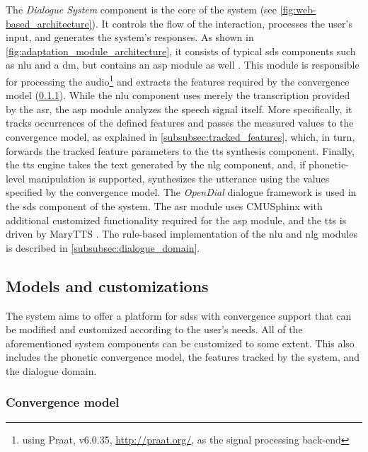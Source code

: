 The \emph{Dialogue System} component is the core of the system (see \cref{fig:web-based_architecture}).
It controls the flow of the interaction, processes the user's input, and generates the system's responses.
As shown in \cref{fig:adaptation_module_architecture}, it consists of typical \ac{sds} components such as \ac{nlu} and a \ac{dm}, but contains an \ac{asp} module as well \citep{Raveh2017SemDial}.
This module is responsible for processing the audio\footnote{\label{foot:praatver}using Praat, v6.0.35, \url{http://praat.org/}, \citep{Boersma2018praat} as the signal processing back-end} and extracts the features required by the convergence model (\cref{subsubsec:convergence_model}).
While the \ac{nlu} component uses merely the transcription provided by the \ac{asr}, the \ac{asp} module analyzes the speech signal itself.
More specifically, it tracks occurrences of the defined features and passes the measured values to the convergence model, as explained in \cref{subsubsec:tracked_features}, which, in turn, forwards the tracked feature parameters to the \ac{tts} synthesis component.
Finally, the \ac{tts} engine takes the text generated by the \ac{nlg} component, and, if phonetic-level manipulation is supported, synthesizes the utterance using the values specified by the convergence model.
The \emph{OpenDial} dialogue framework \citep{Lison2016opendial} is used in the \ac{sds} component of the system.
The \ac{asr} module uses CMUSphinx \citep{Lamere2003sphinx} with additional customized functionality required for the \ac{asp} module, and the \ac{tts} is driven by MaryTTS \citep{LeMaguer2017uprooted, Schroeder2003mary}.
The rule-based implementation of the \ac{nlu} and \ac{nlg} modules is described in \cref{subsubsec:dialogue_domain}.

\subsection{Models and customizations}
\label{subsec:models_and_cusomizations}

The system aims to offer a platform for \acp{sds} with convergence support that can be modified and customized according to the user's needs.
All of the aforementioned system components can be customized to some extent.
This also includes the phonetic convergence model, the features tracked by the system, and the dialogue domain.

\subsubsection{Convergence model}
\label{subsubsec:convergence_model}

